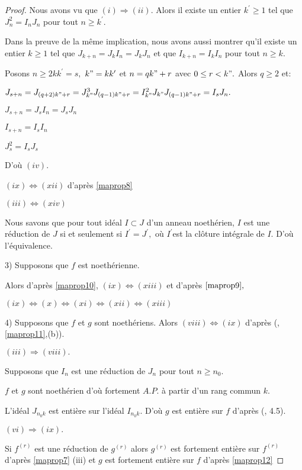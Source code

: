\begin{proof}
	Nous avons vu que $(i)\Longrightarrow (ii).$ Alors il existe un entier $
	k^{\prime }\geq 1$ tel que $J_{n}^{2}=I_{n}J_{n}$ pour tout $n\geq k^{\prime}.$
	
	Dans la preuve de la même implication, nous avons aussi montrer qu'il existe un entier $k\geq 1$ tel que $J_{k+n}=J_{k}I_{n}=J_{k}J_{n}$ et que $I_{k+n}=I_{k}I_{n}$ pour tout $n\geq k.$
	
	Posons $n\geq 2kk^{\prime }=s,$ $k"=kk^{\prime }$ et $n=qk"+r$ avec $0\leq r<k".$ Alors $q\geq 2$ et:
	
	$J_{s+n}=J_{(q+2)k"+r}=J_{k"}^{3}J_{(q-1)k"+r}=I_{k"}^{2}J_{k"}J_{(q-1)k"+r}=I_{s}J_{n}.$
	
	$J_{s+n}=J_{s}I_{n}=J_{s}J_{n}$
	
	$I_{s+n}=I_{s}I_{n}$
	
	$J_{s}^{2}=I_{s}J_{s}$
	
	D'où $(iv).$
	
	$(ix)\Longleftrightarrow (xii)$ d'après \ref{maprop8}
	
	$(iii)\Longleftrightarrow (xiv)$
	
	Nous savons que pour tout idéal $I\subset J$ d'un anneau noethérien, $I$ est une réduction de $J$ si et seulement si $I^{\prime }=J^{\prime },$ où $I^{\prime }$est la clôture intégrale de $I.$ D'où l'équivalence. 
	
	3) Supposons que $f$ est noethérienne.
	
	Alors d'après \ref{maprop10}, $(ix)\Longleftrightarrow (xiii)$ et d'après $\ref{maprop9},$ 
	
	$(ix)\Longleftrightarrow (x)\Longleftrightarrow (xi)\Longleftrightarrow (xii)\Longleftrightarrow (xiii)$
	
	4) Supposons que $f$ et $g$ sont noethériens. Alors $(viii)\Longleftrightarrow (ix)$ d'après (\cite{Di1}, \ref{maprop11},(b)).
	
	$(iii)\Longrightarrow (viii).$
	
	Supposons que $I_{n}$ est une réduction de $J_{n}$ pour tout $n\geq n_{0}.$
	
	$f$ et $g$ sont noethérien d'où fortement $A.P.$ \`{a} partir d'un rang
	commun $k.$
	
	L'idéal $J_{n_{0}k}$ est entière sur l'idéal $I_{n_{0}k}.$ D'où $g$ est entière sur $f$ d'après (\cite{Di1}, 4.5).
	
	$(vi)\Longrightarrow (ix).$
	
	Si $f^{(r)}$ est une réduction de $g^{(r)}$ alors $g^{(r)}$ est fortement entière sur $f^{(r)}$ d'après \ref{maprop7} (iii) et $g$ est fortement entière sur $f$ d'après \ref{maprop12}
	

\end{proof}

